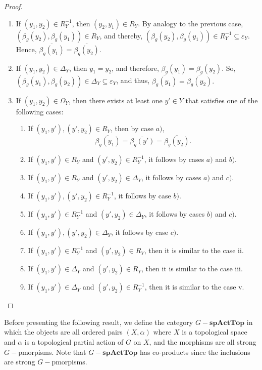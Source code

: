 \documentclass[sn-mathphys-num]{sn-jnl}%
\theoremstyle{thmstyleone}%
\theoremstyle{thmstyletwo}%
\theoremstyle{thmstylethree}%
\begin{document}
\begin{proof}
\begin{enumerate}
\begin{enumerate}
        \item If $ (y_1 , y_2 ) \in R_Y^{-1}$, then $ (y_2 , y_1 ) \in R_Y$. By analogy to the previous case, $(\beta_g(y_2), \beta_g(y_1)) \in R_Y$, and thereby, $(\beta_g(y_2), \beta_g(y_1)) \in R_Y^{-1} \subseteq \varepsilon_Y$. Hence,  $\overline{\beta_g(y_1)} = \overline{\beta_g( y_2)}.$
        \item If $ (y_1 , y_2 ) \in \Delta_Y$, then $y_1 = y_2$, and therefore, $\beta_g(y_1) = \beta_g(y_2)$. So, $(\beta_g(y_1), \beta_g(y_2)) \in \Delta_Y \subseteq \varepsilon_Y$, and thus, $\overline{\beta_g(y_1)} = \overline{\beta_g( y_2)}.$
        \item If $ (y_1 , y_2 ) \in \Omega_Y$, then there exists at least one $y' \in Y$ that satisfies one of the following cases:
  \begin{enumerate}
\item If $(y_1, y'), (y', y_2) \in R_Y$, then by case $a)$,
$$\overline{\beta_g(y_1)} = \overline{\beta_g(y')} = \overline{\beta_g(y_2)}.$$
\item If $(y_1, y') \in R_Y$ and $(y', y_2) \in R_Y^{-1}$, it follows by cases $a)$ and $b)$.
\item If $(y_1, y') \in R_Y$ and $(y', y_2) \in \Delta_Y$, it follows by cases $a)$ and $c)$.
\item If $(y_1, y'), (y', y_2) \in R_Y^{-1}$, it follows by case $b)$.
\item If $(y_1, y') \in R_Y^{-1}$ and $(y', y_2) \in \Delta_Y$, it follows by cases $b)$ and $c)$.
\item If $(y_1, y'), (y', y_2) \in \Delta_Y$, it follows by case $c)$.
\item If $(y_1, y') \in R_Y^{-1}$ and $(y', y_2) \in  R_Y$, then it is similar to the case ii.
\item If $(y_1, y') \in \Delta_Y$ and $(y', y_2) \in  R_Y$, then it is similar to the case iii.
\item If $(y_1, y') \in \Delta_Y$ and $(y', y_2) \in  R_Y^{-1}$, then it is similar to the case v.
\end{enumerate}
\end{enumerate}
\end{enumerate}
\end{proof}
Before presenting the following result, we define the category $G-\mathbf{spActTop}$ in which the objects are all ordered pairs $(X,\alpha)$ where $X$ is a topological space and $\alpha$ is a  topological partial action of $G$ on  $X$, and the morphisms are all strong $G-$pmorpisms. Note that $G-\mathbf{spActTop}$ has co-products since the inclusions are strong $G-$pmorpisms.\\
\end{document}
